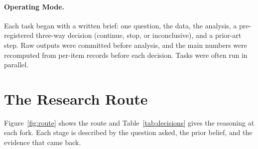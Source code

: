 \documentclass[11pt]{article}
\begin{document}
\paragraph{Operating Mode.} Each task began with a written brief: one question, the data, the analysis, a pre-registered three-way decision (continue, stop, or inconclusive), and a prior-art step. Raw outputs were committed before analysis, and the main numbers were recomputed from per-item records before each decision. Tasks were often run in parallel.

\section{The Research Route}
\label{sec:route}

Figure~\ref{fig:route} shows the route and Table~\ref{tab:decisions} gives the reasoning at each fork. Each stage is described by the question asked, the prior belief, and the evidence that came back.
\end{document}
